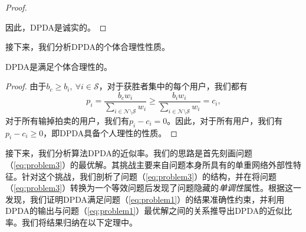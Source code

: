 \begin{proof}
\begin{itemize}
		\end{itemize}
		因此，DPDA是诚实的。
	\end{proof}
	
	接下来，我们分析DPDA的个体合理性性质。
	\begin{thm}\label{thm:ir}
		DPDA是满足个体合理性的。
	\end{thm} 
	\begin{proof}
		由于$b_c\ge b_i,~\forall i\in\mathcal{S}$，对于获胜者集中的每个用户，我们都有\[p_i=\frac{b_{c}w_i}{\sum_{i\in\mathcal{N}\setminus\mathcal{S}}w_i}\ge \frac{b_{i}w_i}{\sum_{i\in\mathcal{N}\setminus\mathcal{S}}w_i}=c_i,\]对于所有输掉拍卖的用户，我们有$p_i-c_i = 0$。因此，对于所有用户，我们有$p_i-c_i\ge0$，即DPDA具备个人理性的性质。
	\end{proof}
	
	接下来，我们分析算法DPDA的近似率。我们的思路是首先刻画问题（\ref{eq:problem3}）的最优解。其挑战主要来自问题本身所具有的单重网络外部性特征。针对这个挑战，我们剖析了问题（\ref{eq:problem3}）的结构，并在将问题（\ref{eq:problem3}）转换为一个等效问题后发现了问题隐藏的\textit{单调性}属性。根据这一发现，我们证明DPDA满足问题（\ref{eq:problem1}）的结果准确性约束，并利用DPDA的输出与问题（\ref{eq:problem1}）最优解之间的关系推导出DPDA的近似比率。我们将结果归纳在以下定理中。
	
